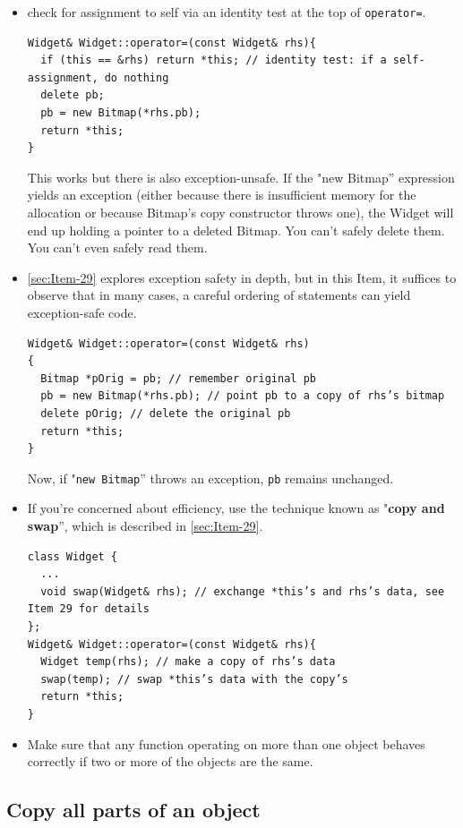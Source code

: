 \begin{itemize}
\item check for assignment to self via an identity test at the top of
  \texttt{operator=}.
\begin{verbatim}
Widget& Widget::operator=(const Widget& rhs){
  if (this == &rhs) return *this; // identity test: if a self-assignment, do nothing
  delete pb;
  pb = new Bitmap(*rhs.pb);
  return *this;
}
\end{verbatim}
  This works but there is also exception-unsafe. If the "new Bitmap''
  expression yields an exception (either because there is insufficient
  memory for the allocation or because Bitmap's copy constructor
  throws one), the Widget will end up holding a pointer to a deleted
  Bitmap.  You can't safely delete them. You can't even safely read them.

\item  \ref{sec:Item-29} explores exception safety in depth,
but in this Item, it suffices to observe that in many cases, a careful
ordering of statements can yield exception-safe code.
\begin{verbatim}
Widget& Widget::operator=(const Widget& rhs)
{
  Bitmap *pOrig = pb; // remember original pb
  pb = new Bitmap(*rhs.pb); // point pb to a copy of rhs’s bitmap
  delete pOrig; // delete the original pb
  return *this;
}
\end{verbatim}
Now, if "\texttt{new Bitmap}'' throws an exception, \texttt{pb}
remains unchanged. 
\item If you're concerned about efficiency, use the technique known as
  "\textbf{copy and swap}'', which is described in \ref{sec:Item-29}.
\begin{verbatim}
class Widget {
  ...
  void swap(Widget& rhs); // exchange *this’s and rhs’s data, see Item 29 for details
};
Widget& Widget::operator=(const Widget& rhs){
  Widget temp(rhs); // make a copy of rhs’s data
  swap(temp); // swap *this’s data with the copy’s
  return *this;
}
\end{verbatim}
\item Make sure that any function operating on more than one object
  behaves correctly if two or more of the objects are the same.
\end{itemize}

\subsection{Copy all parts of an object}
\label{sec:Item-12}

